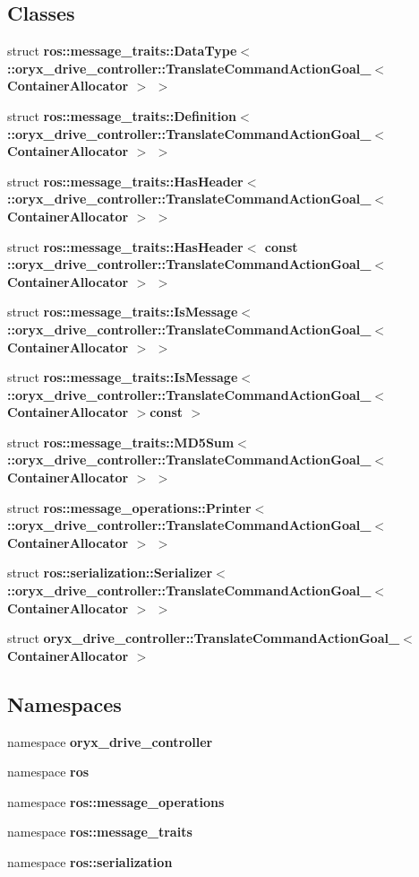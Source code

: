 \subsection*{\-Classes}
\begin{DoxyCompactItemize}
\item 
struct {\bf ros\-::message\-\_\-traits\-::\-Data\-Type$<$ \-::oryx\-\_\-drive\-\_\-controller\-::\-Translate\-Command\-Action\-Goal\-\_\-$<$ Container\-Allocator $>$ $>$}
\item 
struct {\bf ros\-::message\-\_\-traits\-::\-Definition$<$ \-::oryx\-\_\-drive\-\_\-controller\-::\-Translate\-Command\-Action\-Goal\-\_\-$<$ Container\-Allocator $>$ $>$}
\item 
struct {\bf ros\-::message\-\_\-traits\-::\-Has\-Header$<$ \-::oryx\-\_\-drive\-\_\-controller\-::\-Translate\-Command\-Action\-Goal\-\_\-$<$ Container\-Allocator $>$ $>$}
\item 
struct {\bf ros\-::message\-\_\-traits\-::\-Has\-Header$<$ const \-::oryx\-\_\-drive\-\_\-controller\-::\-Translate\-Command\-Action\-Goal\-\_\-$<$ Container\-Allocator $>$ $>$}
\item 
struct {\bf ros\-::message\-\_\-traits\-::\-Is\-Message$<$ \-::oryx\-\_\-drive\-\_\-controller\-::\-Translate\-Command\-Action\-Goal\-\_\-$<$ Container\-Allocator $>$ $>$}
\item 
struct {\bf ros\-::message\-\_\-traits\-::\-Is\-Message$<$ \-::oryx\-\_\-drive\-\_\-controller\-::\-Translate\-Command\-Action\-Goal\-\_\-$<$ Container\-Allocator $>$const  $>$}
\item 
struct {\bf ros\-::message\-\_\-traits\-::\-M\-D5\-Sum$<$ \-::oryx\-\_\-drive\-\_\-controller\-::\-Translate\-Command\-Action\-Goal\-\_\-$<$ Container\-Allocator $>$ $>$}
\item 
struct {\bf ros\-::message\-\_\-operations\-::\-Printer$<$ \-::oryx\-\_\-drive\-\_\-controller\-::\-Translate\-Command\-Action\-Goal\-\_\-$<$ Container\-Allocator $>$ $>$}
\item 
struct {\bf ros\-::serialization\-::\-Serializer$<$ \-::oryx\-\_\-drive\-\_\-controller\-::\-Translate\-Command\-Action\-Goal\-\_\-$<$ Container\-Allocator $>$ $>$}
\item 
struct {\bf oryx\-\_\-drive\-\_\-controller\-::\-Translate\-Command\-Action\-Goal\-\_\-$<$ Container\-Allocator $>$}
\end{DoxyCompactItemize}
\subsection*{\-Namespaces}
\begin{DoxyCompactItemize}
\item 
namespace {\bf oryx\-\_\-drive\-\_\-controller}
\item 
namespace {\bf ros}
\item 
namespace {\bf ros\-::message\-\_\-operations}
\item 
namespace {\bf ros\-::message\-\_\-traits}
\item 
namespace {\bf ros\-::serialization}
\end{DoxyCompactItemize}
